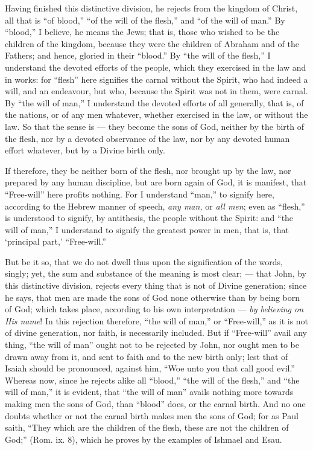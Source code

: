Having finished this distinctive division, he rejects from the kingdom of Christ, all that is “of blood,” “of the will of the flesh,” and “of the will of man.” By “blood,” I believe, he means the Jews; that is, those who wished to be the children of the kingdom, because they were the children of Abraham and of the Fathers; and hence, gloried in their “blood.” By “the will of the flesh,” I understand the devoted efforts of the people, which they exercised in the law and in works: for “flesh” here signifies the carnal without the Spirit, who had indeed a will, and an endeavour, but who, because the Spirit was not in them, were carnal. By “the will of man,” I understand the devoted efforts of all generally, that is, of the nations, or of any men whatever, whether exercised in the law, or without the law. So that the sense is — they become the sons of God, neither by the birth of the flesh, nor by a devoted observance of the law, nor by any devoted human effort whatever, but by a Divine birth only.

If therefore, they be neither born of the flesh, nor brought up by the law, nor prepared by any human discipline, but are born again of God, it is manifest, that “Free-will” here profits nothing. For I understand “man,” to signify here, according to the Hebrew manner of speech, \emph{any man, }or \emph{all men}; even as “flesh,” is understood to signify, by antithesis, the people without the Spirit: and “the will of man,” I understand to signify the greatest power in men, that is, that ‘principal part,’ “Free-will.”

But be it so, that we do not dwell thus upon the signification of the words, singly; yet, the sum and substance of the meaning is most clear; — that John, by this distinctive division, rejects every thing that is not of Divine generation; since he says, that men are made the sons of God none otherwise than by being born of God; which takes place, according to his own interpretation — \emph{by believing on His name}! In this rejection therefore, “the will of man,” or “Free-will,” as it is not of divine generation, nor faith, is necessarily included. But if “Free-will” avail any thing, “the will of man” ought not to be rejected by John, nor ought men to be drawn away from it, and sent to faith and to the new birth only; lest that of Isaiah should be pronounced, against him, “Woe unto you that call good evil.” Whereas now, since he rejects alike all “blood,” “the will of the flesh,” and “the will of man,” it is evident, that “the will of man” avails nothing more towards making men the sons of God, than “blood” does, or the carnal birth. And no one doubts whether or not the carnal birth makes men the sons of God; for as Paul saith, “They which are the children of the flesh, these are not the children of God;” (Rom. ix. 8), which he proves by the examples of Ishmael and Esau.

